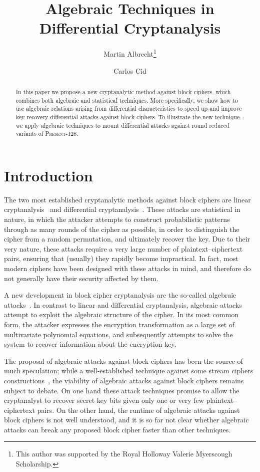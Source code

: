 \documentclass{llncs}
\title{Algebraic Techniques in Differential Cryptanalysis}
\author{Martin Albrecht\thanks{This author was supported by the Royal
Holloway
Valerie Myerscough Scholarship.} \and Carlos Cid}
\institute{Information Security Group,\\
Royal Holloway, University of London\\
Egham, Surrey TW20 0EX, United Kingdom\\
\email{\{M.R.Albrecht,carlos.cid\}@rhul.ac.uk}}
\newcommand{\PRESENT}{\textsc{Present}\xspace}
\begin{document}
\maketitle

\begin{abstract}
In this paper we propose a new cryptanalytic method against block ciphers, which
combines both algebraic and statistical techniques. More specifically, we show
how to use algebraic relations arising from differential characteristics
to speed up and improve key-recovery differential attacks against block ciphers.
To illustrate the new technique, we apply algebraic techniques to mount 
differential attacks against round reduced variants of \PRESENT-128.
\end{abstract}

\section{Introduction}
The two most established cryptanalytic methods against block ciphers are linear
cryptanalysis~\cite{Matsui1993} and differential
cryptanalysis~\cite{des-dc}.
These attacks are statistical in nature, in which the attacker attempts to
construct probabilistic patterns through as many rounds of the cipher as
possible, in order to distinguish the cipher from a random permutation, and
ultimately recover the key. Due to their very nature, these attacks require a
very large number of plaintext--ciphertext pairs, ensuring that (usually) they
rapidly become impractical. In fact, most modern ciphers have been
designed with these attacks in mind, and therefore do not generally have their
security affected by them.

A new development in block cipher cryptanalysis are the so-called algebraic
attacks~\cite{xslpub,murphy-robshaw:crypto2002,alg-aes-book}. In contrast to
linear and differential cryptanalysis, algebraic attacks attempt to exploit the
algebraic structure of the cipher. In its most common form, the attacker
expresses the encryption transformation as a large set of multivariate
polynomial equations, and subsequently attempts to solve the system to recover
information about the encryption key.

The proposal of algebraic attacks against block ciphers has been the source of
much speculation; while a well-established technique against some stream ciphers
constructions~\cite{courtois-meier:eurocrypt2003}, the viability of algebraic
attacks against block ciphers remains subject to debate. On one hand these
attack techniques promise to allow the cryptanalyst to recover secret key bits
given only one or very few plaintext--ciphertext pairs.
On the other hand, the runtime of algebraic attacks against block ciphers is not
well understood, and it is so far not clear whether algebraic attacks can
break any proposed block cipher faster than other techniques.
\end{document}
